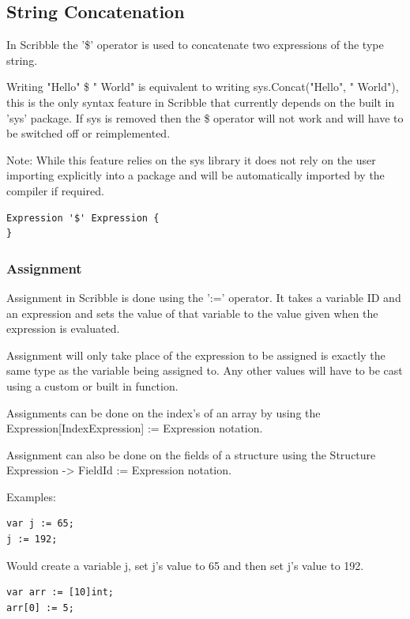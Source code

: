 \documentclass[]{final_report}
\begin{document}
\subsection{String Concatenation}

In Scribble the '\$' operator is used to concatenate two expressions of the type string.

Writing "Hello" \$ " World" is equivalent to writing sys.Concat("Hello", " World"), this is the only syntax feature in Scribble that currently depends on the built in 'sys' package. If sys is removed then the \$ operator will not work and will have to be switched off or reimplemented.

Note: While this feature relies on the sys library it does not rely on the user importing explicitly into a package and will be automatically imported by the compiler if required.

\begin{verbatim}
Expression '$' Expression {
}
\end{verbatim}

\subsubsection{Assignment}

Assignment in Scribble is done using the ':=' operator. It takes a variable ID and an expression and sets the value of that variable to the value given when the expression is evaluated.

Assignment will only take place of the expression to be assigned is exactly the same type as the variable being assigned to. Any other values will have to be cast using a custom or built in function.

Assignments can be done on the index's of an array by using the Expression[IndexExpression] := Expression notation.

Assignment can also be done on the fields of a structure using the Structure Expression -> FieldId := Expression notation. 

Examples: \begin{verbatim}
var j := 65;
j := 192;
\end{verbatim}

Would create a variable j, set j's value to 65 and then set j's value to 192.

\begin{verbatim}
var arr := [10]int;
arr[0] := 5;
\end{verbatim}
\end{document}
